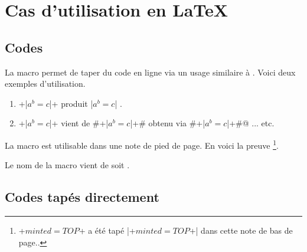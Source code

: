 

\usepackage[lang = french]{../main/main}
\usepackage{../macroenv/macroenv}
\usepackage{../inenglish/inenglish}
\usepackage{../showcase/showcase}
\usepackage{../focus/focus}


\usepackage{listing}




\section{Cas d'utilisation en \LaTeX}

\subsection{Codes }

La macro  permet de taper du code en ligne via un usage similaire à .
Voici deux exemples d'utilisation.

\begin{enumerate}
    \item \bdocinlatex+\bdocinlatex|$a^b = c$|+ produit \bdocinlatex|$a^b = c$| .

    \item \bdocinlatex+\bdocinlatex|$a^b = c$|+ vient de \bdocinlatex#\bdocinlatex+\bdocinlatex|$a^b = c$|+# obtenu via \bdocinlatex@\bdocinlatex#\bdocinlatex+\bdocinlatex|$a^b = c$|+#@ ... etc.
\end{enumerate}


\begin{bdocimportant}
    La macro  est utilisable dans une note de pied de page. En voici la preuve
    \footnote{
    	\bdocinlatex+$minted = TOP$+ a été tapé \bdocinlatex|\bdocinlatex+$minted = TOP$+| dans cette note de bas de page..
    }.
\end{bdocimportant}


\begin{bdocrem}
    Le nom de la macro  vient de  soit .
\end{bdocrem}




\subsection{Codes tapés directement}

